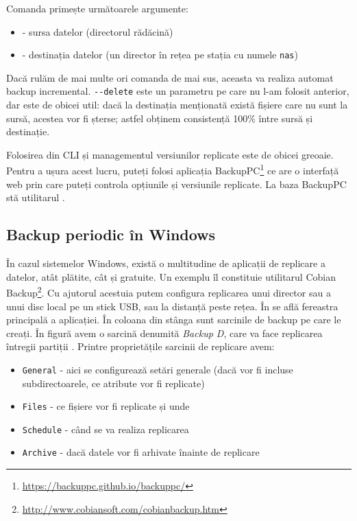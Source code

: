 Comanda  primește următoarele argumente:

\begin{itemize}
  \item \file{/} - sursa datelor (directorul rădăcină)
  \item {} - destinația datelor (un director în rețea pe
    stația cu numele \texttt{nas})
\end{itemize}


Dacă rulăm de mai multe ori comanda de mai sus, aceasta va realiza automat
backup incremental. \texttt{-{}-delete} este un parametru pe care nu l-am folosit
anterior, dar este de obicei util: dacă la destinația menționată există fișiere
care nu sunt la sursă, acestea vor fi șterse; astfel obținem consistență 100\%
între sursă și destinație.

Folosirea  din CLI și managementul versiunilor replicate este de obicei
greoaie. Pentru a ușura acest lucru, puteți folosi aplicația BackupPC\footnote{\url{https://backuppc.github.io/backuppc/}} ce are o interfață web prin care puteți
controla opțiunile și versiunile replicate. La baza BackupPC stă utilitarul
.

\subsection{Backup periodic în Windows}
\label{sec:storage:backup:windows}

În cazul sistemelor Windows, există o multitudine de aplicații de replicare a
datelor, atât plătite, cât și gratuite. Un exemplu îl constituie utilitarul
Cobian Backup\footnote{\url{http://www.cobiansoft.com/cobianbackup.htm}}. Cu ajutorul
acestuia putem configura replicarea unui director sau a unui disc local pe un
stick USB, sau la distanță peste rețea. În
 se află fereastra principală a
aplicației. În coloana din stânga sunt sarcinile de backup pe care le creați. În
figură avem o sarcină denumită \textit{Backup D}, care va face replicarea
întregii partiții . Printre proprietățile sarcinii de replicare avem:

\begin{itemize}
  \item \texttt{General} - aici se configurează setări generale (dacă vor fi
    incluse subdirectoarele, ce atribute vor fi replicate)
  \item \texttt{Files} - ce fișiere vor fi replicate și unde
  \item \texttt{Schedule} - când se va realiza replicarea
  \item \texttt{Archive} - dacă datele vor fi arhivate înainte de replicare
\end{itemize}

